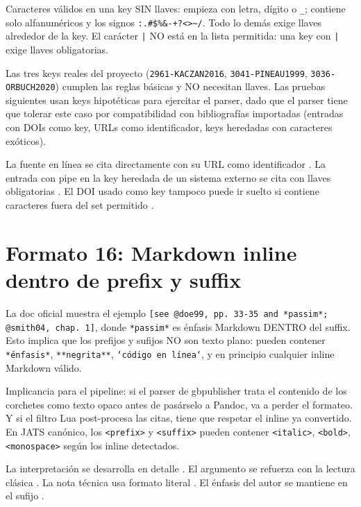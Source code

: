\documentclass{article}
\begin{document}
Caracteres válidos en una key SIN llaves: empieza con letra, dígito o \texttt{\_}; contiene solo alfanuméricos y los signos \texttt{:.\#\$\%\&-+?<>\textasciitilde{}/}. Todo lo demás exige llaves alrededor de la key. El carácter \texttt{|} NO está en la lista permitida: una key con \texttt{|} exige llaves obligatorias.

Las tres keys reales del proyecto (\texttt{2961-KACZAN2016}, \texttt{3041-PINEAU1999}, \texttt{3036-ORBUCH2020}) cumplen las reglas básicas y NO necesitan llaves. Las pruebas siguientes usan keys hipotéticas para ejercitar el parser, dado que el parser tiene que tolerar este caso por compatibilidad con bibliografías importadas (entradas con DOIs como key, URLs como identificador, keys heredadas con caracteres exóticos).

La fuente en línea se cita directamente con su URL como identificador \autocite{https_www.pagina12.com.ar_}. La entrada con pipe en la key heredada de un sistema externo se cita con llaves obligatorias \autocite{2961-KACZAN2016_variante-extendida}. El DOI usado como key tampoco puede ir suelto si contiene caracteres fuera del set permitido \autocite{10.5821_ace.v4i12.2483}.


\section{Formato 16: Markdown inline dentro de prefix y suffix}
La doc oficial muestra el ejemplo \texttt{[see @doe99, pp. 33-35 and *passim*; @smith04, chap. 1]}, donde \texttt{*passim*} es énfasis Markdown DENTRO del suffix. Esto implica que los prefijos y sufijos NO son texto plano: pueden contener \texttt{*énfasis*}, \texttt{**negrita**}, \texttt{`código en línea`}, y en principio cualquier inline Markdown válido.

Implicancia para el pipeline: si el parser de gbpublisher trata el contenido de los corchetes como texto opaco antes de pasárselo a Pandoc, va a perder el formateo. Y si el filtro Lua post-procesa las citas, tiene que respetar el inline ya convertido. En JATS canónico, los \texttt{<prefix>} y \texttt{<suffix>} pueden contener \texttt{<italic>}, \texttt{<bold>}, \texttt{<monospace>} según los inline detectados.

La interpretación se desarrolla en detalle \autocite[ver especialmente][pp. 33-35 y \textit{passim}]{2961-KACZAN2016}. El argumento se refuerza con la lectura clásica \autocite[\textbf{comparar con}][cap. 3, \textit{muy especialmente}]{3041-PINEAU1999}. La nota técnica usa formato literal \autocite[ver \texttt{appendix-B.tex} para los datos crudos]{3036-ORBUCH2020}. El énfasis del autor se mantiene en el sufijo \autocite[\textit{cursivas del original}]{2961-KACZAN2016}.
\end{document}
